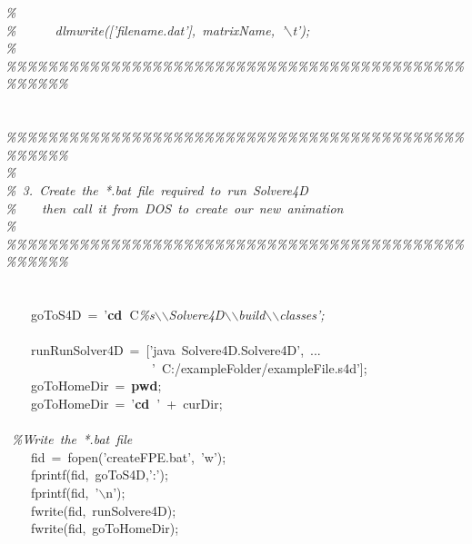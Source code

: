 \documentclass{article}
\newcommand{\hlstd}[1]{\textcolor[rgb]{0,0,0}{#1}}
\newcommand{\hlkey}[1]{\textcolor[rgb]{0,0,1}{\bf{#1}}}
\newcommand{\hltyp}[1]{\textcolor[rgb]{0,0,1}{#1}}
\newcommand{\hlcom}[1]{\textcolor[rgb]{0.4,0.4,0.4}{\it{#1}}}
\begin{document}
{}\hlstd{}\hlcom{\%\\
}\hlstd{}\hlcom{\%\hlstd{\ \ \ \ \ \ }dlmwrite(['filename.dat'],\ matrixName,\ '$\backslash$t');\\
}\hlstd{}\hlcom{\%\\
}\hlstd{}\hlcom{\%\%\%\%\%\%\%\%\%\%\%\%\%\%\%\%\%\%\%\%\%\%\%\%\%\%\%\%\%\%\%\%\%\%\%\%\%\%\%\%\%\%\%\%\%\%\%\%\%\%\mbox{}\\
}\hlstd{\mbox{}\\
\\
}\hlcom{\%\%\%\%\%\%\%\%\%\%\%\%\%\%\%\%\%\%\%\%\%\%\%\%\%\%\%\%\%\%\%\%\%\%\%\%\%\%\%\%\%\%\%\%\%\%\%\%\%\%\\
}\hlstd{}\hlcom{\%\\
}\hlstd{}\hlcom{\%\ 3.\ Create\ the\ *.bat\ file\ required\ to\ run\ Solvere4D\\
}\hlstd{}\hlcom{\%\hlstd{\ \ \ \ }then\ call\ it\ from\ DOS\ to\ create\ our\ new\ animation\\
}\hlstd{}\hlcom{\%\\
}\hlstd{}\hlcom{\%\%\%\%\%\%\%\%\%\%\%\%\%\%\%\%\%\%\%\%\%\%\%\%\%\%\%\%\%\%\%\%\%\%\%\%\%\%\%\%\%\%\%\%\%\%\%\%\%\%\mbox{}\\
}\hlstd{\mbox{}\\
\\
\hlstd{\ \ \ \ }goToS4D\ =\ '}\hlkey{cd\ }\hlstd{C}\hlcom{\%s$\backslash$$\backslash$Solvere4D$\backslash$$\backslash$build$\backslash$$\backslash$classes';\mbox{}\\
}\hlstd{\\
\hlstd{\ \ \ \ }runRunSolver4D\ =\ ['java\ Solvere4D.Solvere4D',\ ...\\
\hlstd{\ \ \ \ \ \ \ \ \ \ \ \ \ \ \ \ \ \ \ \ \ \ \ }'\ C:/exampleFolder/exampleFile.s4d'];\\
\hlstd{\ \ \ \ }goToHomeDir\ =\ }\hlkey{pwd}\hlstd{;\\
\hlstd{\ \ \ \ }goToHomeDir\ =\ '}\hlkey{cd\ }\hlstd{'\ +\ curDir;\mbox{}\\
\\
\ }\hlcom{\%Write\ the\ *.bat\ file\\
}\hlstd{\hlstd{\ \ \ \ }fid\ =\ }\hltyp{fopen}\hlstd{('createFPE.bat',\ 'w');\\
\hlstd{\ \ \ \ }}\hltyp{fprintf}\hlstd{(fid,\ goToS4D,':');\\
\hlstd{\ \ \ \ }}\hltyp{fprintf}\hlstd{(fid,\ '$\backslash$n');\\
\hlstd{\ \ \ \ }}\hltyp{fwrite}\hlstd{(fid,\ runSolvere4D);\\
\hlstd{\ \ \ \ }}\hltyp{fwrite}\hlstd{(fid,\ goToHomeDir);\\
}
\end{document}

